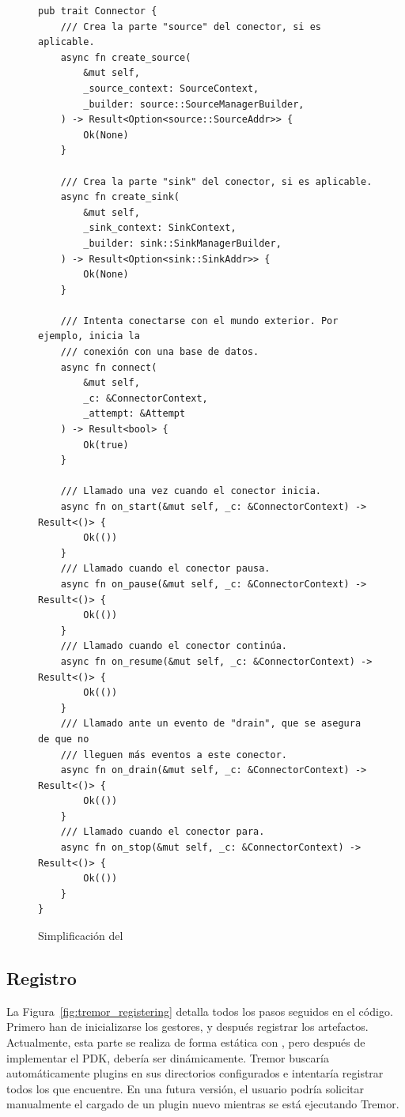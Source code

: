 \begin{figure}[h]
    \centering
    \begin{verbatim}
pub trait Connector {
    /// Crea la parte "source" del conector, si es aplicable.
    async fn create_source(
        &mut self,
        _source_context: SourceContext,
        _builder: source::SourceManagerBuilder,
    ) -> Result<Option<source::SourceAddr>> {
        Ok(None)
    }

    /// Crea la parte "sink" del conector, si es aplicable.
    async fn create_sink(
        &mut self,
        _sink_context: SinkContext,
        _builder: sink::SinkManagerBuilder,
    ) -> Result<Option<sink::SinkAddr>> {
        Ok(None)
    }

    /// Intenta conectarse con el mundo exterior. Por ejemplo, inicia la
    /// conexión con una base de datos.
    async fn connect(
        &mut self,
        _c: &ConnectorContext,
        _attempt: &Attempt
    ) -> Result<bool> {
        Ok(true)
    }

    /// Llamado una vez cuando el conector inicia.
    async fn on_start(&mut self, _c: &ConnectorContext) -> Result<()> {
        Ok(())
    }
    /// Llamado cuando el conector pausa.
    async fn on_pause(&mut self, _c: &ConnectorContext) -> Result<()> {
        Ok(())
    }
    /// Llamado cuando el conector continúa.
    async fn on_resume(&mut self, _c: &ConnectorContext) -> Result<()> {
        Ok(())
    }
    /// Llamado ante un evento de "drain", que se asegura de que no
    /// lleguen más eventos a este conector.
    async fn on_drain(&mut self, _c: &ConnectorContext) -> Result<()> {
        Ok(())
    }
    /// Llamado cuando el conector para.
    async fn on_stop(&mut self, _c: &ConnectorContext) -> Result<()> {
        Ok(())
    }
}
    \end{verbatim}
    \caption{Simplificación del \trait {}}%
    \label{fig:tremor_connector_trait}
\end{figure}

\subsection{Registro}

La Figura~\ref{fig:tremor_registering} detalla todos los pasos seguidos en el
código. Primero han de inicializarse los gestores, y después registrar los
artefactos. Actualmente, esta parte se realiza de forma estática con
, pero después de implementar el PDK, debería ser
dinámicamente. Tremor buscaría automáticamente plugins en sus directorios
configurados e intentaría registrar todos los que encuentre. En una futura
versión, el usuario podría solicitar manualmente el cargado de un plugin nuevo
mientras se está ejecutando Tremor.

